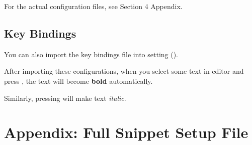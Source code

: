 \documentclass{article}
\begin{document}
For the actual configuration files, see Section 4 Appendix.

\subsection{Key Bindings}

You can also import the key bindings file into  setting ().

\begin{codeblock}
\end{codeblock}

After importing these configurations, when you select some text in editor and press , the text will become \textbf{bold} automatically.

Similarly, pressing  will make text \textit{italic}.

\section{Appendix: Full Snippet Setup File}
\end{document}
